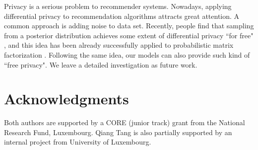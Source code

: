 \documentclass[conference]{IEEEtran}
\begin{document}
Privacy is a serious problem to recommender systems. Nowadays, applying differential privacy to recommendation algorithms attracts great attention. A common approach is adding noise to data set. Recently, people find that sampling from a posterior distribution achieves some extent of differential privacy ``for free" \cite{wang2015privacy}, and this idea has been already successfully applied to probabilistic matrix factorization \cite{liu2015fast}. Following the same idea, our models can also provide such kind of ``free privacy". We leave a detailed investigation as future work.

\section{Acknowledgments}
Both authors are supported by a CORE (junior track) grant from the National Research Fund, Luxembourg. Qiang Tang is also partially supported by an internal project from University of Luxembourg.

%


\end{document}
